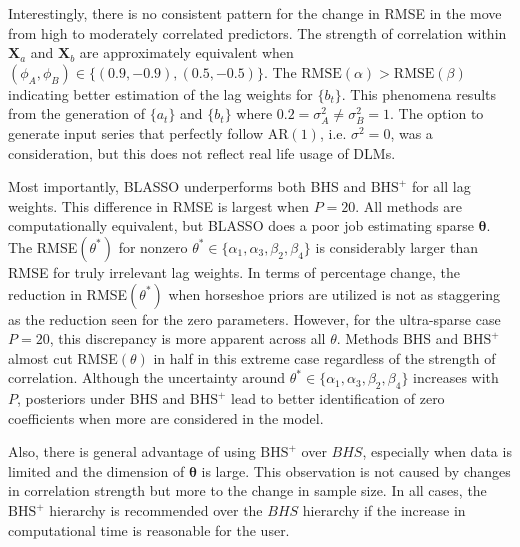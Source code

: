 Interestingly, there is no consistent pattern for the change in RMSE in the move from high to moderately correlated predictors. The strength of correlation within $\bm{X}_a$ and $\bm{X}_b$ are approximately equivalent when $(\phi_A,\phi_B)\in\{(0.9,-0.9),(0.5,-0.5)\}$. The $\textrm{RMSE}(\alpha)>\textrm{RMSE}(\beta)$ indicating better estimation of the lag weights for $\{b_t\}$. This phenomena results from the generation of $\{a_t\}$ and $\{b_t\}$ where $0.2=\sigma^2_A\neq\sigma^2_B=1$. The option to generate input series that perfectly follow AR$(1)$, i.e. $\sigma^2=0$, was a consideration, but this does not reflect real life usage of DLMs.

Most importantly, BLASSO underperforms both BHS and $\textrm{BHS}^+$ for all lag weights. This difference in RMSE is largest when $P=20$. All methods are computationally equivalent, but BLASSO does a poor job estimating sparse $\bm{\theta}$. The RMSE$(\theta^*)$ for nonzero $\theta^*\in\{\alpha_1,\alpha_3,\beta_2,\beta_4\}$ is considerably larger than RMSE for truly irrelevant lag weights. In terms of percentage change, the reduction in RMSE$(\theta^*)$ when horseshoe priors are utilized is not as staggering as the reduction seen for the zero parameters. However, for the ultra-sparse case $P=20$, this discrepancy is more apparent across all $\theta$. Methods BHS and $\textrm{BHS}^+$ almost cut RMSE$(\theta)$ in half in this extreme case regardless of the strength of correlation. Although the uncertainty around $\theta^*\in\{\alpha_1,\alpha_3,\beta_2,\beta_4\}$ increases with $P$, posteriors under BHS and $\textrm{BHS}^+$ lead to better identification of zero coefficients when more are considered in the model.

Also, there is general advantage of using $\textrm{BHS}^+$ over $BHS$, especially when data is limited and the dimension of $\bm{\theta}$ is large. This observation is not caused by changes in correlation strength but more to the change in sample size. In all cases, the $\textrm{BHS}^+$ hierarchy is recommended over the $BHS$ hierarchy if the increase in computational time is reasonable for the user.

